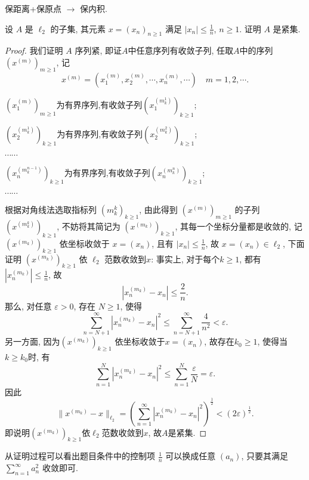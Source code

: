 \begin{remark}
保距离+保原点 $\rightarrow$ 保内积.
\end{remark}




\begin{exercise}
    设 $A$ 是 $\ell_2$ 的子集, 其元素 $x=(x_n)_{n\geq 1}$ 满足 $|x_n|\leq\frac{1}{n}$, $n\geq 1$. 证明 $A$ 是紧集.
\end{exercise}

\begin{proof}
我们证明 $A$ 序列紧, 即证$A$中任意序列有收敛子列, 任取$A$中的序列$(x^{(m)})_{m\geq 1}$, 记
\[x^{(m)}=\left(x^{(m)}_1,x^{(m)}_2,\cdots,x^{(m)}_n,\cdots\right)\quad m=1,2,\cdots.\]

$\left(x_1^{(m)}\right)_{m\geq 1}$为有界序列,有收敛子列$\left(x_1^{(m_k^1)}\right)_{k\geq 1}$;

$\left(x_2^{(m_k^1)}\right)_{k\geq 1}$为有界序列,有收敛子列$\left(x_2^{(m_k^2)}\right)_{k\geq 1}$;

$\cdots\cdots$

$\left(x_n^{(m_k^{n-1})}\right)_{k\geq 1}$为有界序列,有收敛子列$\left(x_n^{(m_k^n)}\right)_{k\geq 1}$;

$\cdots\cdots$

根据对角线法选取指标列 $\left(m_k^k\right)_{k\geq 1}$, 
由此得到 $(x^{(m)})_{m\geq 1}$ 的子列 $(x^{(m_k^k)})_{k\geq 1}$, 
不妨将其简记为 $(x^{(m_k)})_{k\geq 1}$, 其每一个坐标分量都是收敛的, 
记 $(x^{(m_k)})_{k\geq 1}$ 依坐标收敛于 $x=(x_n)$, 且有 $|x_n|\leq\frac{1}{n}$, 
故 $x=(x_n)\in\ell_2$, 
下面证明 $(x^{(m_k)})_{k\geq 1}$ 依 $\ell_2$ 范数收敛到$x$: 
事实上, 对于每个$k\geq 1$, 都有 $|x_n^{(m_k)}|\leq\frac{1}{n}$, 故
\[|x_n^{(m_k)}-x_n|\leq\frac{2}{n}.\]
那么, 对任意 $\varepsilon>0$, 存在 $N\geq 1$, 使得
\[\sum_{n=N+1}^{\infty}|x_n^{(m_k)}-x_n|^2\leq\sum_{n=N+1}^{\infty}\frac{4}{n^2}<\varepsilon.\]
另一方面, 因为$(x^{(m_k)})_{k\geq 1}$ 依坐标收敛于$x=(x_n)$, 故存在$k_0\geq 1$, 使得当 $k\geq k_0$时, 有
\[\sum_{n=1}^N|x_n^{(m_k)}-x_n|^2\leq\sum_{n=1}^N\frac{\varepsilon}{N}=\varepsilon.\]
因此
\[\|x^{(m_k)}-x\|_{\ell_2}=\left(\sum_{n=1}^{\infty}|x_n^{(m_k)}-x_n|^2\right)^{\frac{1}{2}}<(2\varepsilon)^{\frac{1}{2}}.\]
即说明$(x^{(m_k)})_{k\geq 1}$依$\ell_2$范数收敛到$x$, 故$A$是紧集.
\end{proof}

\begin{remark}
从证明过程可以看出题目条件中的控制项 $\frac{1}{n}$ 可以换成任意 $(a_n)$, 只要其满足 $\sum_{n=1}^{\infty}a_n^2$ 收敛即可.
\end{remark}




